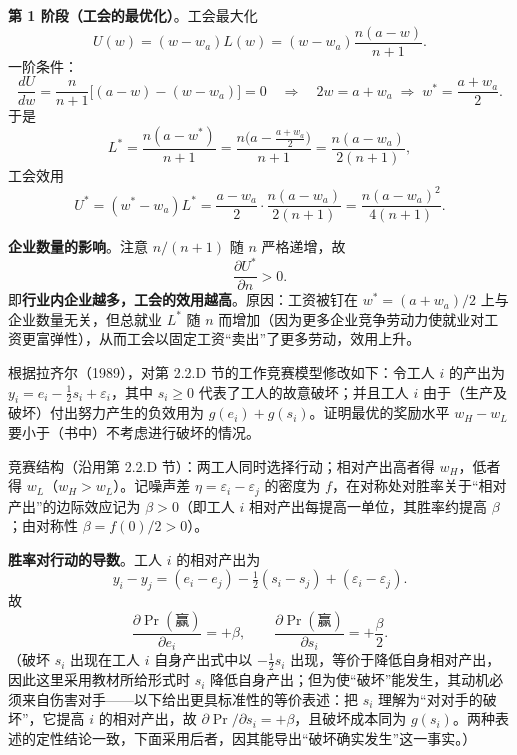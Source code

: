 \textbf{第 1 阶段（工会的最优化）}。工会最大化
\[
U(w)=(w-w_a)L(w)=(w-w_a)\frac{n(a-w)}{n+1}.
\]\indent
一阶条件：
\[
\frac{dU}{dw}=\frac{n}{n+1}\bigl[(a-w)-(w-w_a)\bigr]=0
\quad\Longrightarrow\quad
2w=a+w_a\;\Longrightarrow\; w^*=\frac{a+w_a}{2}.
\]\indent
于是
\[
L^*=\frac{n(a-w^*)}{n+1}
=\frac{n\bigl(a-\frac{a+w_a}{2}\bigr)}{n+1}
=\frac{n(a-w_a)}{2(n+1)},
\]\indent
工会效用
\[
U^*=(w^*-w_a)L^*
=\frac{a-w_a}{2}\cdot\frac{n(a-w_a)}{2(n+1)}
=\frac{n(a-w_a)^2}{4(n+1)}.
\]

\textbf{企业数量的影响}。注意 $n/(n+1)$ 随 $n$ 严格递增，故
\[
\frac{\partial U^*}{\partial n}>0.
\]\indent
即\textbf{行业内企业越多，工会的效用越高}。原因：工资被钉在 $w^*=(a+w_a)/2$ 上与企业数量无关，但总就业 $L^*$ 随 $n$ 而增加（因为更多企业竞争劳动力使就业对工资更富弹性），从而工会以固定工资“卖出”了更多劳动，效用上升。

根据拉齐尔（1989），对第 2.2.D 节的工作竞赛模型修改如下：令工人 $i$ 的产出为 $y_i=e_i-\frac12 s_i+\varepsilon_i$，其中 $s_i\ge 0$ 代表了工人的故意破坏；并且工人 $i$ 由于（生产及破坏）付出努力产生的负效用为 $g(e_i)+g(s_i)$。证明最优的奖励水平 $w_H-w_L$ 要小于（书中）不考虑进行破坏的情况。

\sol
竞赛结构（沿用第 2.2.D 节）：两工人同时选择行动；相对产出高者得 $w_H$，低者得 $w_L$（$w_H>w_L$）。记噪声差 $\eta=\varepsilon_i-\varepsilon_j$ 的密度为 $f$，在对称处对胜率关于“相对产出”的边际效应记为 $\beta>0$（即工人 $i$ 相对产出每提高一单位，其胜率约提高 $\beta$；由对称性 $\beta=f(0)/2>0$）。

\textbf{胜率对行动的导数}。工人 $i$ 的相对产出为
\[
y_i-y_j=(e_i-e_j)-\tfrac12(s_i-s_j)+(\varepsilon_i-\varepsilon_j).
\]\indent
故
\[
\frac{\partial\Pr(\text{赢})}{\partial e_i}=+\beta,\qquad
\frac{\partial\Pr(\text{赢})}{\partial s_i}=+\frac{\beta}{2}.
\]\indent
（破坏 $s_i$ 出现在工人 $i$ 自身产出式中以 $-\tfrac12 s_i$ 出现，等价于降低自身相对产出，因此这里采用教材所给形式时 $s_i$ 降低自身产出；但为使“破坏”能发生，其动机必须来自伤害对手——以下给出更具标准性的等价表述：把 $s_i$ 理解为“对对手的破坏”，它提高 $i$ 的相对产出，故 $\partial\Pr/\partial s_i=+\beta$，且破坏成本同为 $g(s_i)$。两种表述的定性结论一致，下面采用后者，因其能导出“破坏确实发生”这一事实。）


